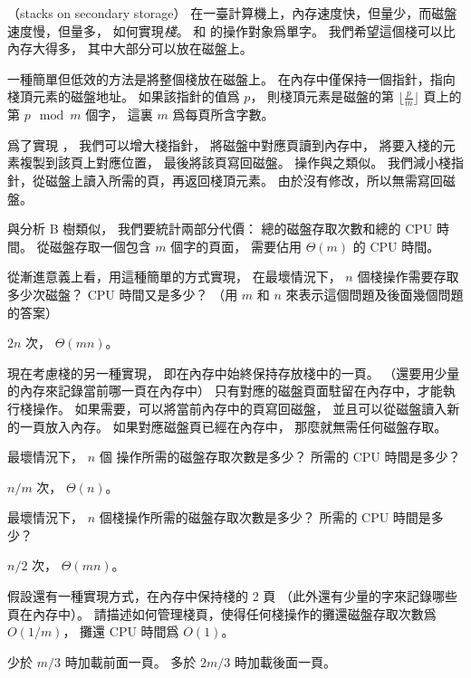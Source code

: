 \startPROBLEM
（stacks on secondary storage）
在一臺計算機上，內存速度快，但量少，而磁盤速度慢，但量多，
如何實現\emph{棧}。
 和  的操作對象爲單字。
我們希望這個棧可以比內存大得多，
其中大部分可以放在磁盤上。

一種簡單但低效的方法是將整個棧放在磁盤上。
在內存中僅保持一個指針，指向棧頂元素的磁盤地址。
如果該指針的值爲 $p$，
則棧頂元素是磁盤的第 $\lfloor \frac{p}{m}\rfloor$ 頁上的第 $p \mod m$ 個字，
這裏 $m$ 爲每頁所含字數。

爲了實現 ，
我們可以增大棧指針，
將磁盤中對應頁讀到內存中，
將要入棧的元素複製到該頁上對應位置，
最後將該頁寫回磁盤。
  操作與之類似。
我們減小棧指針，從磁盤上讀入所需的頁，再返回棧頂元素。
由於沒有修改，所以無需寫回磁盤。

與分析 B 樹類似，
我們要統計兩部分代價：
總的磁盤存取次數和總的 CPU 時間。
從磁盤存取一個包含 $m$ 個字的頁面，
需要佔用 $\Theta(m)$ 的 CPU 時間。

\startigBase[a]\startitem
從漸進意義上看，用這種簡單的方式實現，
在最壞情況下，
$n$ 個棧操作需要存取多少次磁盤？
CPU 時間又是多少？
（用 $m$ 和 $n$ 來表示這個問題及後面幾個問題的答案）
\stopitem\stopigBase

\startANSWER
$2n$ 次， $\Theta(mn)$。
\stopANSWER

現在考慮棧的另一種實現，
即在內存中始終保持存放棧中的一頁。
（還要用少量的內存來記錄當前哪一頁在內存中）
只有對應的磁盤頁面駐留在內存中，才能執行棧操作。
如果需要，可以將當前內存中的頁寫回磁盤，
並且可以從磁盤讀入新的一頁放入內存。
如果對應磁盤頁已經在內存中，
那麼就無需任何磁盤存取。

\startigBase[continue]\startitem
最壞情況下， $n$ 個  操作所需的磁盤存取次數是多少？
所需的 CPU 時間是多少？
\stopitem\stopigBase

\startANSWER
$n/m$ 次， $\Theta(n)$。
\stopANSWER

\startigBase[continue]\startitem
最壞情況下， $n$ 個棧操作所需的磁盤存取次數是多少？
所需的 CPU 時間是多少？
\stopitem\stopigBase

\startANSWER
$n/2$ 次， $\Theta(mn)$。
\stopANSWER

假設還有一種實現方式，在內存中保持棧的 2 頁
（此外還有少量的字來記錄哪些頁在內存中）。
\startigBase[continue]\startitem
請描述如何管理棧頁，使得任何棧操作的攤還磁盤存取次數爲 $O(1/m)$，
攤還 CPU 時間爲 $O(1)$。
\stopitem\stopigBase

\startANSWER
少於 $m/3$ 時加載前面一頁。
多於 $2m/3$ 時加載後面一頁。
\stopANSWER

\stopPROBLEM